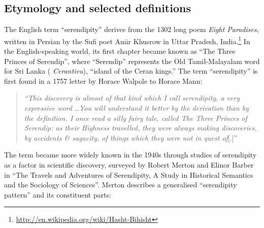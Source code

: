 
\subsection{Etymology and selected definitions} \label{sec:overview-serendipity}  
The English term ``serendipity'' derives from the 1302 long poem \emph{Eight Paradises}, written in Persian by the Sufi poet Am\={\i}r Khusrow in Uttar Pradesh, India.\footnote{\url{http://en.wikipedia.org/wiki/Hasht-Bihisht}}  In the English-speaking world, its first chapter became known as ``The Three Princes of Serendip'', where ``Serendip'' represents the Old Tamil-Malayalam word for Sri Lanka (%
\emph{Cerantivu}), ``island of the Ceran kings.''
%
The term ``serendipity'' is first found in a 1757 letter by Horace Walpole to Horace Mann:
\begin{quote}
\emph{``This discovery is almost of that kind which I call serendipity, a very expressive
word} \ldots \emph{You will understand it better by the derivation than by the
definition. I once read a silly fairy tale, called The Three Princes of Serendip:
as their Highness travelled, they were always making discoveries, by accidents
\& sagacity, of things which they were not in quest of}[.]''~\cite[p. 633]{van1994anatomy}
\end{quote}
The term became more widely known in the 1940s through studies of serendipity as a factor in scientific discovery, surveyed by Robert Merton and Elinor Barber \citeyear{merton} in ``The Travels and Adventures of Serendipity, A Study in Historical Semantics and the Sociology of Sciences''.  Merton \citeyear{merton1948bearing} \cite<cited in>[pp. 195--196]{merton} describes a generalised ``serendipity pattern'' and its constituent parts:

